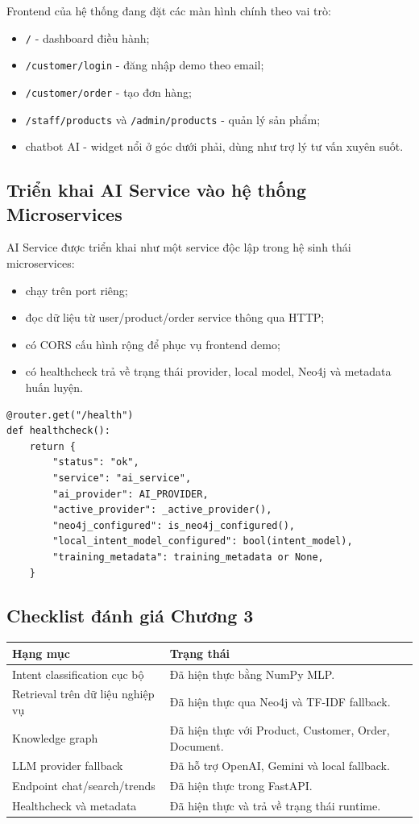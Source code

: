 \documentclass[12pt,a4paper]{article}
\begin{document}
Frontend của hệ thống đang đặt các màn hình chính theo vai trò:
\begin{itemize}
  \item \texttt{/} - dashboard điều hành;
  \item \texttt{/customer/login} - đăng nhập demo theo email;
  \item \texttt{/customer/order} - tạo đơn hàng;
  \item \texttt{/staff/products} và \texttt{/admin/products} - quản lý sản phẩm;
  \item chatbot AI - widget nổi ở góc dưới phải, dùng như trợ lý tư vấn xuyên suốt.
\end{itemize}

\subsection{Triển khai AI Service vào hệ thống Microservices}
AI Service được triển khai như một service độc lập trong hệ sinh thái microservices:
\begin{itemize}
  \item chạy trên port riêng;
  \item đọc dữ liệu từ user/product/order service thông qua HTTP;
  \item có CORS cấu hình rộng để phục vụ frontend demo;
  \item có healthcheck trả về trạng thái provider, local model, Neo4j và metadata huấn luyện.
\end{itemize}

\begin{lstlisting}[style=code,caption={Healthcheck của AI Service}]
@router.get("/health")
def healthcheck():
    return {
        "status": "ok",
        "service": "ai_service",
        "ai_provider": AI_PROVIDER,
        "active_provider": _active_provider(),
        "neo4j_configured": is_neo4j_configured(),
        "local_intent_model_configured": bool(intent_model),
        "training_metadata": training_metadata or None,
    }
\end{lstlisting}

\subsection{Checklist đánh giá Chương 3}
\begin{longtable}{p{8.8cm}p{4.8cm}}
\toprule
\textbf{Hạng mục} & \textbf{Trạng thái} \\
\midrule
Intent classification cục bộ & Đã hiện thực bằng NumPy MLP. \\
Retrieval trên dữ liệu nghiệp vụ & Đã hiện thực qua Neo4j và TF-IDF fallback. \\
Knowledge graph & Đã hiện thực với Product, Customer, Order, Document. \\
LLM provider fallback & Đã hỗ trợ OpenAI, Gemini và local fallback. \\
Endpoint chat/search/trends & Đã hiện thực trong FastAPI. \\
Healthcheck và metadata & Đã hiện thực và trả về trạng thái runtime. \\
\bottomrule
\end{longtable}
\end{document}

